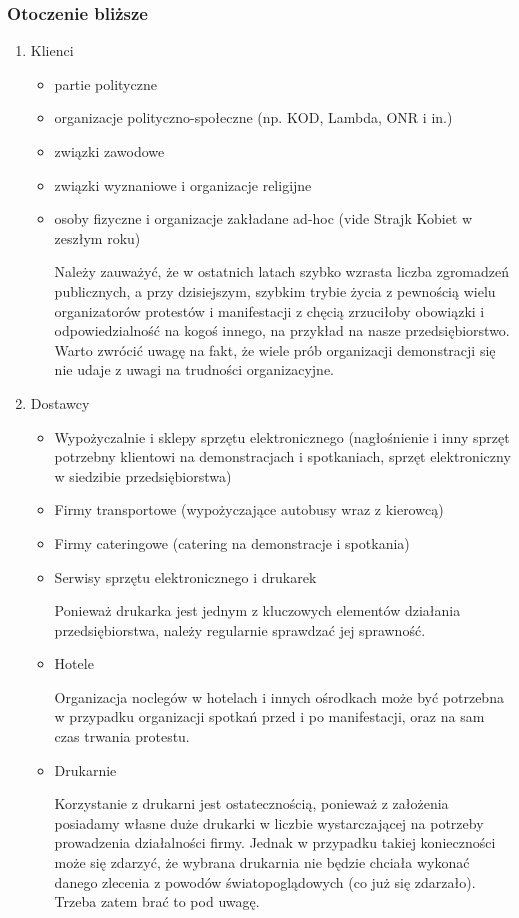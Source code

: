 \documentclass{article}
\begin{document}
\subsubsection{Otoczenie bliższe} %
\begin{enumerate}
\item Klienci
	\begin{itemize}
	\item partie polityczne
	\item organizacje polityczno-społeczne (np. KOD, Lambda, ONR i in.)
	\item związki zawodowe
	\item związki wyznaniowe i organizacje religijne
	\item osoby fizyczne i organizacje zakładane ad-hoc (vide Strajk Kobiet w zeszłym roku)
	
	Należy zauważyć, że w ostatnich latach szybko wzrasta liczba zgromadzeń publicznych, a przy dzisiejszym, szybkim trybie życia z pewnością wielu organizatorów protestów i manifestacji z chęcią zrzuciłoby obowiązki i odpowiedzialność na kogoś innego, na przykład na nasze przedsiębiorstwo. Warto zwrócić uwagę na fakt, że wiele prób organizacji demonstracji się nie udaje z uwagi na trudności organizacyjne.
	
	
	\end{itemize}
\item Dostawcy
	\begin{itemize}
	\item Wypożyczalnie i sklepy sprzętu elektronicznego (nagłośnienie i inny sprzęt potrzebny klientowi na demonstracjach i spotkaniach, sprzęt elektroniczny w siedzibie przedsiębiorstwa)
	\item Firmy transportowe (wypożyczające autobusy wraz z kierowcą)
	\item Firmy cateringowe (catering na demonstracje i spotkania)
	\item Serwisy sprzętu elektronicznego i drukarek
	
	Ponieważ drukarka jest jednym z kluczowych elementów działania przedsiębiorstwa, należy regularnie sprawdzać jej sprawność.
	\item Hotele
	
	Organizacja noclegów w hotelach i innych ośrodkach może być potrzebna w przypadku organizacji spotkań przed i po manifestacji, oraz na sam czas trwania protestu.
	\item Drukarnie
	
	Korzystanie z drukarni jest ostatecznością, ponieważ z założenia posiadamy własne duże drukarki w liczbie wystarczającej na potrzeby prowadzenia działalności firmy. Jednak w przypadku takiej konieczności może się zdarzyć, że wybrana drukarnia nie będzie chciała wykonać danego zlecenia z powodów światopoglądowych (co już się zdarzało). Trzeba zatem brać to pod uwagę.
	

\end{itemize}
\end{enumerate}
\end{document}
